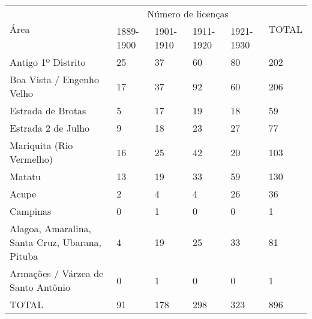 \begin{table}[!htp]
{
\begin{tiny}
\begin{tabular}{llllll}
\toprule
\multirow{2}{*}{Área}	& \multicolumn{4}{c}{Número de licenças}	& \multirow{2}{*}{TOTAL}\\
\cline{2-5}
	&1889-1900	&1901-1910	&1911-1920	&1921-1930	& \\
\midrule
\midrule
Antigo 1º Distrito	&25	&37	&60	&80	&202\\
Boa Vista / Engenho Velho	&17	&37	&92	&60	&206\\
Estrada de Brotas	&5	&17	&19	&18	&59\\
Estrada 2 de Julho	&9	&18	&23	&27	&77\\
Mariquita (Rio Vermelho)	&16	&25	&42	&20	&103\\
Matatu	&13	&19	&33	&59	&130\\
Acupe	&2	&4	&4	&26	&36\\
Campinas	&0	&1	&0	&0	&1\\
Alagoa, Amaralina, Santa Cruz, Ubarana, Pituba	&4	&19	&25	&33	&81\\
Armações / Várzea de Santo Antônio	&0	&1	&0	&0	&1\\
\midrule
TOTAL	&91	&178	&298	&323	&896\\
\bottomrule
\end{tabular} 
\end{tiny}
}
{}
\end{table}
